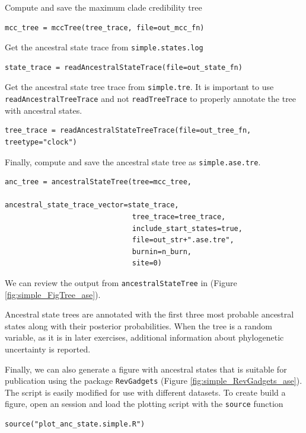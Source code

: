 Compute and save the maximum clade credibility tree
\begin{snugshade}
\begin{lstlisting}
mcc_tree = mccTree(tree_trace, file=out_mcc_fn)
\end{lstlisting}
\end{snugshade}

Get the ancestral state trace from {\tt simple.states.log}

\begin{snugshade}
\begin{lstlisting}
state_trace = readAncestralStateTrace(file=out_state_fn)
\end{lstlisting}
\end{snugshade}


Get the ancestral state tree trace from {\tt simple.tre}.
It is important to use {\tt readAncestralTreeTrace} and not {\tt readTreeTrace} to properly annotate the tree with ancestral states.

\begin{snugshade}
\begin{lstlisting}
tree_trace = readAncestralStateTreeTrace(file=out_tree_fn, treetype="clock")
\end{lstlisting}
\end{snugshade}

Finally, compute and save the ancestral state tree as {\tt simple.ase.tre}.

\begin{snugshade}
\begin{lstlisting}
anc_tree = ancestralStateTree(tree=mcc_tree,
                              ancestral_state_trace_vector=state_trace,
                              tree_trace=tree_trace,
                              include_start_states=true,
                              file=out_str+".ase.tre",
                              burnin=n_burn,
                              site=0)
\end{lstlisting}
\end{snugshade}

We can review the output from {\tt ancestralStateTree} in \FigTree (Figure \ref{fig:simple_FigTree_ase}).

Ancestral state trees are annotated with the first three most probable ancestral states along with their posterior probabilities.
When the tree is a random variable, as it is in later exercises, additional information about phylogenetic uncertainty is reported.

Finally, we can also generate a figure with ancestral states that is suitable for publication using the \R package {\tt RevGadgets} (Figure \ref{fig:simple_RevGadgets_ase}).
The script is easily modified for use with different datasets.
To create build a figure, open an \R session and load the plotting script with the {\tt source} function
\begin{snugshade}
\begin{lstlisting}
source("plot_anc_state.simple.R")
\end{lstlisting}
\end{snugshade}

